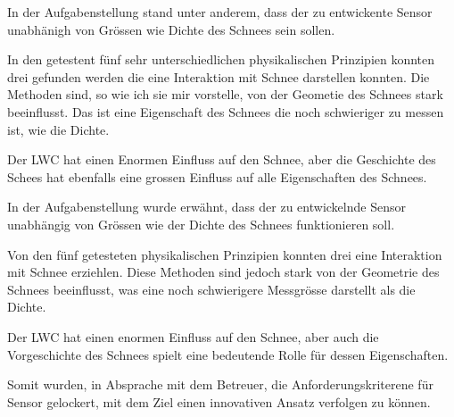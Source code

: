 In der Aufgabenstellung stand unter anderem, dass der zu entwickente Sensor unabhänigh von Grössen wie Dichte des Schnees sein sollen.

In den getestent fünf sehr unterschiedlichen physikalischen Prinzipien konnten drei gefunden werden die eine Interaktion mit Schnee darstellen konnten. Die Methoden sind, so wie ich sie mir vorstelle, von der Geometie des Schnees stark beeinflusst. Das ist eine Eigenschaft des Schnees die noch schwieriger zu messen ist, wie die Dichte.

Der LWC hat einen Enormen Einfluss auf den Schnee, aber die Geschichte des Schees hat ebenfalls eine grossen Einfluss auf alle Eigenschaften des Schnees.


In der Aufgabenstellung wurde erwähnt, dass der zu entwickelnde Sensor unabhängig von Grössen wie der Dichte des Schnees funktionieren soll.

Von den fünf getesteten physikalischen Prinzipien konnten drei eine Interaktion mit Schnee erziehlen. Diese Methoden sind jedoch stark von der Geometrie des Schnees beeinflusst, was eine noch schwierigere Messgrösse darstellt als die Dichte.

Der LWC hat einen enormen Einfluss auf den Schnee, aber auch die Vorgeschichte des Schnees spielt eine bedeutende Rolle für dessen Eigenschaften.

Somit wurden, in Absprache mit dem Betreuer, die Anforderungskriterene für Sensor gelockert, mit dem Ziel einen innovativen Ansatz verfolgen zu können.
